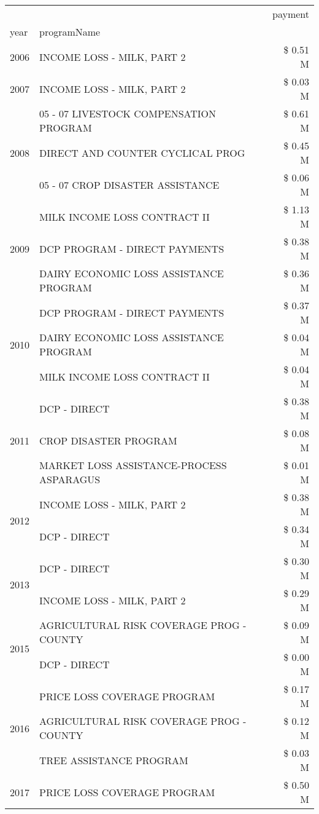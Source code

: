 \begin{tabular}{llr}
\toprule
 &  & payment \\
year & programName &  \\
\midrule
2006 & INCOME LOSS - MILK, PART 2 & \$ 0.51 M \\
\cline{1-3}
2007 & INCOME LOSS - MILK, PART 2 & \$ 0.03 M \\
\cline{1-3}
\multirow[t]{3}{*}{2008} & 05 - 07 LIVESTOCK COMPENSATION PROGRAM & \$ 0.61 M \\
 & DIRECT AND COUNTER CYCLICAL PROG & \$ 0.45 M \\
 & 05 - 07 CROP DISASTER ASSISTANCE & \$ 0.06 M \\
\cline{1-3}
\multirow[t]{3}{*}{2009} & MILK INCOME LOSS CONTRACT II & \$ 1.13 M \\
 & DCP PROGRAM - DIRECT PAYMENTS & \$ 0.38 M \\
 & DAIRY ECONOMIC LOSS ASSISTANCE PROGRAM & \$ 0.36 M \\
\cline{1-3}
\multirow[t]{3}{*}{2010} & DCP PROGRAM - DIRECT PAYMENTS & \$ 0.37 M \\
 & DAIRY ECONOMIC LOSS ASSISTANCE PROGRAM & \$ 0.04 M \\
 & MILK INCOME LOSS CONTRACT II & \$ 0.04 M \\
\cline{1-3}
\multirow[t]{3}{*}{2011} & DCP - DIRECT & \$ 0.38 M \\
 & CROP DISASTER PROGRAM & \$ 0.08 M \\
 & MARKET LOSS ASSISTANCE-PROCESS ASPARAGUS & \$ 0.01 M \\
\cline{1-3}
\multirow[t]{2}{*}{2012} & INCOME LOSS - MILK, PART 2 & \$ 0.38 M \\
 & DCP - DIRECT & \$ 0.34 M \\
\cline{1-3}
\multirow[t]{2}{*}{2013} & DCP - DIRECT & \$ 0.30 M \\
 & INCOME LOSS - MILK, PART 2 & \$ 0.29 M \\
\cline{1-3}
\multirow[t]{2}{*}{2015} & AGRICULTURAL RISK COVERAGE PROG - COUNTY & \$ 0.09 M \\
 & DCP - DIRECT & \$ 0.00 M \\
\cline{1-3}
\multirow[t]{3}{*}{2016} & PRICE LOSS COVERAGE PROGRAM                   & \$ 0.17 M \\
 & AGRICULTURAL RISK COVERAGE PROG - COUNTY      & \$ 0.12 M \\
 & TREE ASSISTANCE PROGRAM                       & \$ 0.03 M \\
\cline{1-3}
\multirow[t]{3}{*}{2017} & PRICE LOSS COVERAGE PROGRAM & \$ 0.50 M \\

\end{tabular}
